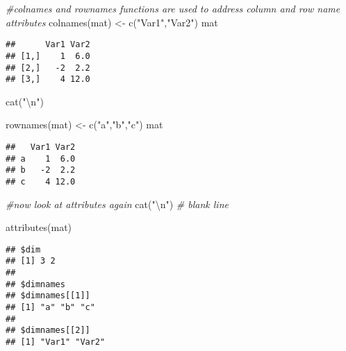 \documentclass[
]{article}
\newenvironment{Shaded}{\begin{snugshade}}{\end{snugshade}}
\newcommand{\CommentTok}[1]{\textcolor[rgb]{0.56,0.35,0.01}{\textit{#1}}}
\newcommand{\FunctionTok}[1]{\textcolor[rgb]{0.00,0.00,0.00}{#1}}
\newcommand{\NormalTok}[1]{#1}
\newcommand{\OtherTok}[1]{\textcolor[rgb]{0.56,0.35,0.01}{#1}}
\newcommand{\SpecialCharTok}[1]{\textcolor[rgb]{0.00,0.00,0.00}{#1}}
\newcommand{\StringTok}[1]{\textcolor[rgb]{0.31,0.60,0.02}{#1}}
\begin{document}
\begin{Shaded}
\begin{Highlighting}[]
\CommentTok{\#colnames and rownames functions are used to address column and row name attributes}
\FunctionTok{colnames}\NormalTok{(mat) }\OtherTok{\textless{}{-}} \FunctionTok{c}\NormalTok{(}\StringTok{"Var1"}\NormalTok{,}\StringTok{"Var2"}\NormalTok{)}
\NormalTok{mat}
\end{Highlighting}
\end{Shaded}

\begin{verbatim}
##      Var1 Var2
## [1,]    1  6.0
## [2,]   -2  2.2
## [3,]    4 12.0
\end{verbatim}

\begin{Shaded}
\begin{Highlighting}[]
\FunctionTok{cat}\NormalTok{(}\StringTok{"}\SpecialCharTok{\textbackslash{}n}\StringTok{"}\NormalTok{)}
\end{Highlighting}
\end{Shaded}

\begin{Shaded}
\begin{Highlighting}[]
\FunctionTok{rownames}\NormalTok{(mat) }\OtherTok{\textless{}{-}} \FunctionTok{c}\NormalTok{(}\StringTok{"a"}\NormalTok{,}\StringTok{"b"}\NormalTok{,}\StringTok{"c"}\NormalTok{)}
\NormalTok{mat}
\end{Highlighting}
\end{Shaded}

\begin{verbatim}
##   Var1 Var2
## a    1  6.0
## b   -2  2.2
## c    4 12.0
\end{verbatim}

\begin{Shaded}
\begin{Highlighting}[]
\CommentTok{\#now look at attributes again}
\FunctionTok{cat}\NormalTok{(}\StringTok{"}\SpecialCharTok{\textbackslash{}n}\StringTok{"}\NormalTok{)    }\CommentTok{\# blank line}
\end{Highlighting}
\end{Shaded}

\begin{Shaded}
\begin{Highlighting}[]
\FunctionTok{attributes}\NormalTok{(mat)}
\end{Highlighting}
\end{Shaded}

\begin{verbatim}
## $dim
## [1] 3 2
## 
## $dimnames
## $dimnames[[1]]
## [1] "a" "b" "c"
## 
## $dimnames[[2]]
## [1] "Var1" "Var2"
\end{verbatim}
\end{document}

